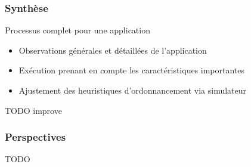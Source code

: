 \documentclass[xcolor={usenames,dvipsnames,svgnames,table}, aspectratio=43]{beamer}
\begin{document}
\begin{frame}
  \frametitle{Synthèse}

  \begin{block}{Processus complet pour une application}
    \begin{itemize}
      \item Observations générales et détaillées de l'application
      \item Exécution prenant en compte les caractéristiques importantes
      \item Ajustement des heuristiques d'ordonnancement via simulateur
    \end{itemize}
  \end{block}
  TODO improve

\end{frame}

\begin{frame}
  \frametitle{Perspectives}

  TODO

\end{frame}




\end{document}
